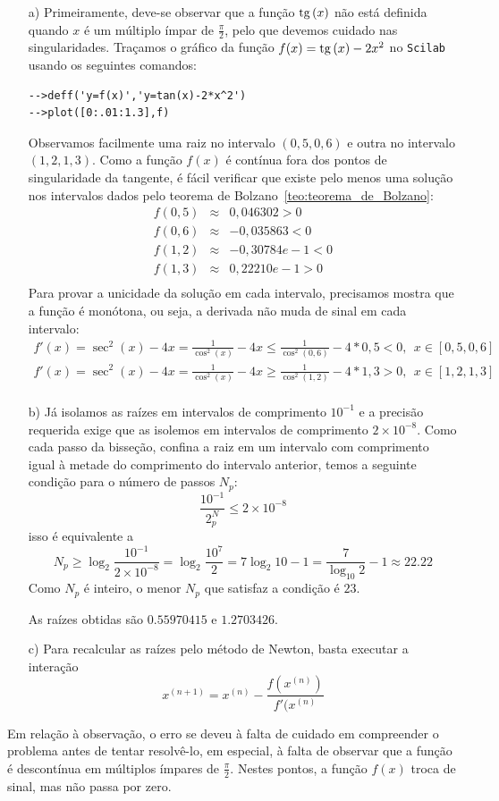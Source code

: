 \begin{Answer}
  \begin{tiny}
    \begin{itemize}
\item[a)]Primeiramente, deve-se observar que a função $\operatorname{tg}\,(x)$ não está definida quando $x$ é um múltiplo ímpar de $\frac{\pi}{2}$, pelo que devemos cuidado nas singularidades. Traçamos o gráfico da função $f(x)=\operatorname{tg}\,(x)-2x^2$ no \verb+Scilab+ usando os seguintes comandos:
\begin{verbatim}
-->deff('y=f(x)','y=tan(x)-2*x^2')
-->plot([0:.01:1.3],f)
\end{verbatim} 
Observamos facilmente uma raiz no intervalo $(0,5, 0,6)$ e outra no intervalo $(1,2, 1,3)$. Como a função $f(x)$ é contínua fora dos pontos de singularidade da tangente, é fácil verificar que existe pelo menos uma solução nos intervalos dados pelo teorema de Bolzano~\ref{teo:teorema_de_Bolzano}:
\begin{eqnarray*}
f(0,5) &\approx& 0,046302 >0\\
f(0,6) &\approx& -0,035863 <0\\
f(1,2) &\approx& -0,30784e-1 <0\\
f(1,3) &\approx&  0,22210e-1>0\\
\end{eqnarray*} 
Para provar a unicidade da solução em cada intervalo, precisamos mostra que a função é monótona, ou seja, a derivada não muda de sinal em cada intervalo:
\begin{eqnarray*}
f'(x)=\sec^2(x)-4x=\frac{1}{\cos^2(x)}-4x\leq \frac{1}{\cos^2(0,6)}-4*0,5<0, ~~x\in[ 0,5, 0,6]\\
f'(x)=\sec^2(x)-4x=\frac{1}{\cos^2(x)}-4x\geq \frac{1}{\cos^2(1,2)}-4*1,3>0, ~~x\in[ 1,2, 1,3]\\
\end{eqnarray*} 

\item[b)] 
Já isolamos as raízes em intervalos de comprimento $10^{-1}$ e a precisão requerida exige que as isolemos em intervalos de comprimento $2\times 10^{-8}$. Como cada passo da bisseção, confina a raiz em um intervalo com comprimento igual à metade do comprimento do intervalo anterior, temos a seguinte condição para o número de passos $N_p$:
$$\frac{10^{-1}}{2^N_p}\leq 2\times 10^{-8}$$
isso é equivalente a
$$N_p\geq \log_2 \frac{10^{-1}}{2\times 10^{-8}}=\log_2 \frac{10^{7}}{2}=7\log_2 10 -1=\frac{7}{\log_10 2}-1\approx 22.22$$
Como $N_p$ é inteiro, o menor $N_p$ que satisfaz a condição é $23$.

As raízes obtidas são $0.55970415$ e $1.2703426$. 

\item[c)] Para recalcular as raízes pelo método de Newton, basta executar a interação
$$x^{(n+1)}=x^{(n)}-\frac{f(x^{(n)})}{f'(x^{(n)}}$$    
\end{itemize}
Em relação à observação, o erro se deveu à falta de cuidado em compreender o problema antes de tentar resolvê-lo, em especial, à falta de observar que a função é descontínua em  múltiplos ímpares de $\frac{\pi}{2}$. Nestes pontos, a função $f(x)$ troca de sinal, mas não passa por zero.    
  \end{tiny}
\end{Answer}
\fi


